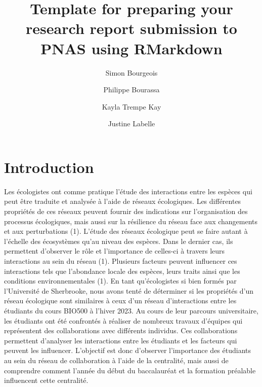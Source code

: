 \documentclass[9pt,twocolumn,twoside,]{pnas-new}
\title{Template for preparing your research report submission to PNAS
using RMarkdown}
\author[a]{Simon Bourgeois}
\author[a]{Philippe Bourassa}
\author[a]{Kayla Trempe Kay}
\author[a]{Justine Labelle}
\affil[a]{Université de Sherbrooke, Départment de biologie, 2500
Boulevard de l'Université, Sherbrooke, Québec, J1K 2R1}
\begin{document}
\verticaladjustment{-2pt}



\maketitle
\thispagestyle{firststyle}


\acknow{}

\hypertarget{introduction}{%
\section{Introduction}\label{introduction}}

Les écologistes ont comme pratique l'étude des interactions entre les
espèces qui peut être traduite et analysée à l'aide de réseaux
écologiques. Les différentes propriétés de ces réseaux peuvent fournir
des indications sur l'organisation des processus écologiques, mais aussi
sur la résilience du réseau face aux changements et aux perturbations
(1). L'étude des réseaux écologique peut se faire autant à l'échelle des
écosystèmes qu'au niveau des espèces. Dans le dernier cas, ils
permettent d'observer le rôle et l'importance de celles-ci à travers
leurs interactions au sein du réseau (1). Plusieurs facteurs peuvent
influencer ces interactions tels que l'abondance locale des espèces,
leurs traits ainsi que les conditions environnementales (1). En tant
qu'écologistes si bien formés par l'Université de Sherbrooke, nous avons
tenté de déterminer si les propriétés d'un réseau écologique sont
similaires à ceux d'un réseau d'interactions entre les étudiants du
cours BIO500 à l'hiver 2023. Au cours de leur parcours universitaire,
les étudiants ont été confrontés à réaliser de nombreux travaux
d'équipes qui représentent des collaborations avec différents individus.
Ces collaborations permettent d'analyser les interactions entre les
étudiants et les facteurs qui peuvent les influencer. L'objectif est
donc d'observer l'importance des étudiants au sein du réseau de
collaboration à l'aide de la centralité, mais aussi de comprendre
comment l'année du début du baccalauréat et la formation préalable
influencent cette centralité.
\end{document}

